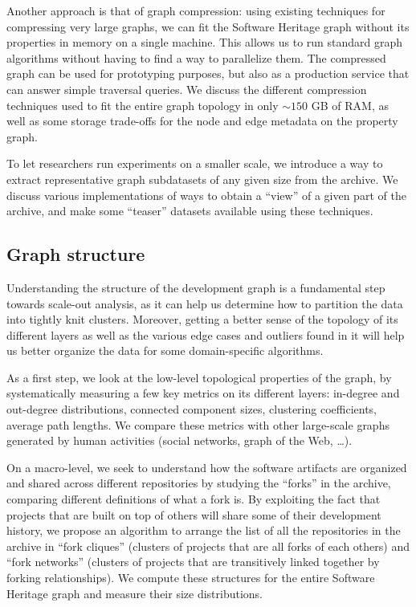Another approach is that of graph compression: using existing techniques for
compressing very large graphs, we can fit the Software Heritage graph without
its properties in memory on a single machine. This allows us to run standard
graph algorithms without having to find a way to parallelize them. The
compressed graph can be used for prototyping purposes, but also as a production
service that can answer simple traversal queries. We discuss the different
compression techniques used to fit the entire graph topology in only $\sim150$
GB of RAM, as well as some storage trade-offs for the node and edge metadata on
the property graph.

To let researchers run experiments on a smaller scale, we introduce a way to
extract representative graph subdatasets of any given size from the archive. We
discuss various implementations of ways to obtain a ``view'' of a given part of
the archive, and make some ``teaser'' datasets available using these techniques.

\subsection*{Graph structure}

Understanding the structure of the development graph is a fundamental step
towards scale-out analysis, as it can help us determine how to partition the
data into tightly knit clusters. Moreover, getting a better sense of the
topology of its different layers as well as the various edge cases and outliers
found in it will help us better organize the data for some domain-specific
algorithms.

As a first step, we look at the low-level topological properties of the graph,
by systematically measuring a few key metrics on its different layers:
in-degree and out-degree distributions, connected component sizes, clustering
coefficients, average path lengths. We compare these metrics with other
large-scale graphs generated by human activities (social networks, graph of the
Web, …).

On a macro-level, we seek to understand how the software artifacts are
organized and shared across different repositories by studying the ``forks'' in
the archive, comparing different definitions of what a fork is. By exploiting
the fact that projects that are built on top of others will share some of their
development history, we propose an algorithm to arrange the list of all the
repositories in the archive in ``fork cliques'' (clusters of projects that are
all forks of each others) and ``fork networks'' (clusters of projects that are
transitively linked together by forking relationships). We compute these
structures for the entire Software Heritage graph and measure their size
distributions.

